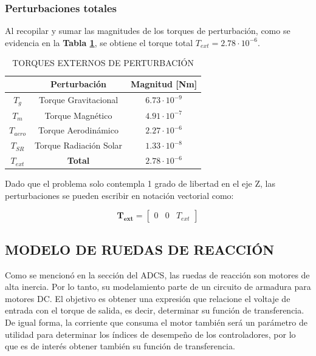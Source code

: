 \subsubsection{Perturbaciones totales}
\hfill \break
Al recopilar y sumar las magnitudes de los torques de perturbación, como se evidencia en la \textbf{Tabla \ref{table:pertubaciones}}, se obtiene el torque total $T_{ext} = 2.78\cdot10^{-6}$. 

\begin{table}[h]
	\caption{\MakeUppercase{Torques externos de perturbación }}
	\begin{center}
		\begin{tabular}{ c c c}
			
			 &  \textbf{Perturbación} &  \textbf{Magnitud [Nm]}\\ \hline
			$T_g$ &  Torque Gravitacional & $6.73\cdot10^{-9}$ \\ 
			$T_m$ &  Torque Magnético & $4.91\cdot10^{-7}$ \\ 
			$T_{aero}$ &  Torque Aerodinámico & $2.27\cdot10^{-6}$ \\ 
			$T_{SR}$ &  Torque  Radiación Solar& $1.33\cdot10^{-8}$ \\ \hline
			\mbox{\boldmath$T_{ext}$} &  \textbf{Total}& \mbox{\boldmath$2.78\cdot10^{-6}$} \\
		\end{tabular}
	\end{center}
	\label{table:pertubaciones}
\end{table}

Dado que el problema solo contempla 1 grado de libertad en el eje Z, las perturbaciones se pueden escribir en notación vectorial como:

\begin{equation}\label{eq:torquePerturbacionVec}
	\mathbf{T_{ext}}=\left[\begin{array}{lll}
		0 & 0 & T_{ext}
	\end{array}\right]
\end{equation}

\subsection{MODELO DE RUEDAS DE REACCIÓN}

Como se mencionó en la sección del ADCS, las ruedas de reacción son motores de alta inercia. Por lo tanto, su modelamiento parte de un circuito de armadura para motores DC. El objetivo es obtener una expresión que relacione el voltaje de entrada con el torque de salida, es decir, determinar su función de transferencia. De igual forma, la corriente que consuma el motor también será un parámetro de utilidad para determinar los índices de desempeño de los controladores, por lo que es de interés obtener también su función de transferencia.
 
